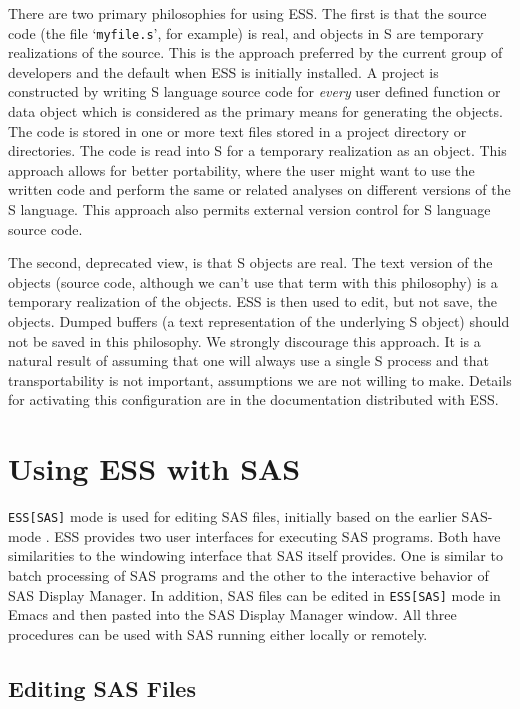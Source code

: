 \documentclass{article}
\newcommand{\stexttt}[1]{{\small\texttt{#1}}}
\newcommand{\ssf}[1]{{\small\sf{#1}}}
\newcommand{\file}[1]{`\stexttt{#1}'}
\begin{document}
There are two primary philosophies for using ESS.  The first is that
the source code (the file \file{myfile.s}, for example) is real, and
objects in S are temporary realizations of the source.  This is the
approach preferred by the current group of developers and the default
when ESS is initially installed.  A project is constructed by writing
S language source code for \emph{every} user defined function or data
object which is considered as the primary means for generating the
objects.  The code is stored in one or more text files stored in a
project directory or directories.  The code is read into S for a
temporary realization as an object.  This approach allows for better
portability, where the user might want to use the written code and
perform the same or related analyses on different versions of the S
language.  This approach also permits external version control for S
language source code.

The second, deprecated view, is that S objects are real.  The text
version of the objects (source code, although we can't use that term
with this philosophy) is a temporary realization of the objects.  ESS
is then used to edit, but not save, the objects.  Dumped buffers (a
text representation of the underlying S object) should not be saved in
this philosophy.  We strongly discourage this approach.  It is a
natural result of assuming that one will always use a single S process
and that transportability is not important, assumptions we are not
willing to make.  Details for activating this configuration are in the
documentation distributed with ESS.

\section{Using ESS with SAS}
\label{sec:SAS}

\stexttt{ESS[SAS]} mode is used for editing SAS files, initially based
on the earlier SAS-mode \citep{SASMODE}.  ESS provides two user
interfaces for executing SAS programs.  Both have similarities to the
windowing interface that SAS itself provides.  One is similar to batch
processing of SAS programs and the other to the interactive behavior
of SAS Display Manager.  In addition, SAS files can be edited in
\stexttt{ESS[SAS]} mode in Emacs and then pasted into the SAS Display
Manager \ssf{Program Editor} window.  All three procedures can be used
with SAS running either locally or remotely.

\subsection{Editing SAS Files}
\label{sec:SAS:edit}
\end{document}
